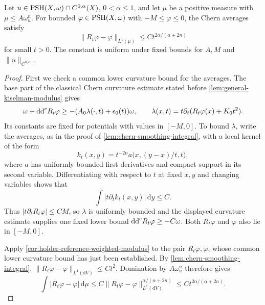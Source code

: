 \begin{lemma}\label{lem:holder-reference-chern-error}
Let $u\in\mathrm{PSH}(X,\omega)\cap C^{0,\alpha}(X)$, $0<\alpha\leq1$, and let $\mu$ be a positive measure with $\mu\leq A\omega_u^n$. For bounded $\varphi\in\mathrm{PSH}(X,\omega)$ with $-M\leq\varphi\leq0$, the Chern averages satisfy
\[
 \|R_t\varphi-\varphi\|_{L^1(\mu)}
 \leq C t^{2\alpha/(\alpha+2n)}
\]
for small $t>0$. The constant is uniform under fixed bounds for $A,M$ and $\|u\|_{C^{0,\alpha}}$.
\end{lemma}
\begin{proof}
First we check a common lower curvature bound for the averages. The base part of the classical Chern curvature estimate stated before \cref{lem:general-kiselman-modulus} gives
\[
 \omega+\mathrm{dd}^{\mathrm{c}} R_t\varphi
 \geq-(A_0\lambda(\cdot,t)+\epsilon_0(t))\omega,
 \qquad \lambda(x,t)=t\partial_t(R_t\varphi(x)+K_0t^2).
\]
Its constants are fixed for potentials with values in $[-M,0]$. To bound $\lambda$, write the averages, as in the proof of \cref{lem:chern-smoothing-integral}, with a local kernel of the form
\[
 k_t(x,y)=t^{-2n}a\bigl(x,(y-x)/t,t\bigr),
\]
where $a$ has uniformly bounded first derivatives and compact support in its second variable. Differentiating with respect to $t$ at fixed $x,y$ and changing variables shows that
\[
 \int|t\partial_t k_t(x,y)|\,\mathrm dy\leq C.
\]
Thus $|t\partial_tR_t\varphi|\leq CM$, so $\lambda$ is uniformly bounded and the displayed curvature estimate supplies one fixed lower bound $\mathrm{dd}^{\mathrm{c}} R_t\varphi\geq-C\omega$. Both $R_t\varphi$ and $\varphi$ also lie in $[-M,0]$.

Apply \cref{cor:holder-reference-weighted-modulus} to the pair $R_t\varphi,\varphi$, whose common lower curvature bound has just been established. By \cref{lem:chern-smoothing-integral}, $\|R_t\varphi-\varphi\|_{L^1(\mathrm dV)}\leq Ct^2$. Domination by $A\omega_u^n$ therefore gives
\[
 \int|R_t\varphi-\varphi|\,\mathrm d\mu
 \leq C\|R_t\varphi-\varphi\|_{L^1(\mathrm dV)}^{\alpha/(\alpha+2n)}
 \leq Ct^{2\alpha/(\alpha+2n)}.
\]
\end{proof}
